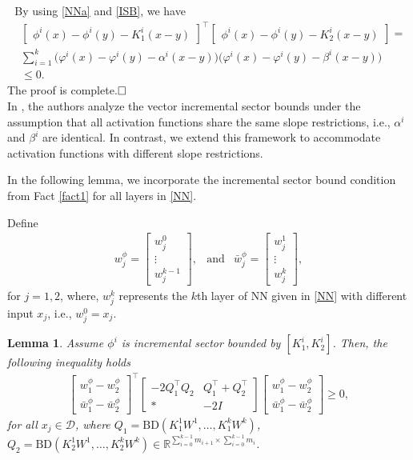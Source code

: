 \documentclass[journal,twoside,web]{ieeecolor}
\renewenvironment{proof}{\vspace{.1cm}\noindent{\sc Proof.}\hspace{0.10cm}\,\,}{$\hfill\Box$\vspace{.1cm}}
\newtheorem{lemma}              [theorem]{Lemma}
\newcommand{\bbm}[1]{\left[\begin{matrix} #1 \end{matrix}\right]}
\begin{document}
\begin{proof}
By using \eqref{NNa} and \eqref{ISB}, we have
\begin{equation}\label{ISBV1}
 \begin{aligned}
&\bbm{\phi^i(x)-\phi^i(y)-K_{1}^i(x-y)}^\top\bbm{\phi^i(x)-\phi^i(y)-K_{2}^i(x-y)}=\\&\sum_{i=1}^{k}\Big(\varphi^i(x)-\varphi^i(y)-\alpha^i(x-y)\Big) \Big(\varphi^i(x)-\varphi^i(y)-\beta^i(x-y)\Big)\\&\leq 0. 
 \end{aligned}
\end{equation}
The proof is complete.\end{proof}\\
In \cite[Lem. 2]{fazlyab2020safety}, the authors analyze the vector incremental sector bounds under the assumption that all activation functions share the same slope restrictions, i.e., $\alpha^i$ and $\beta^i$ are identical. In contrast, we extend this framework to accommodate activation functions with different slope restrictions.

In the following lemma, we incorporate the incremental sector bound condition from Fact \ref{fact1} for all layers in \eqref{NN}. 

Define 
\begin{equation}\label{NNVW}
 \begin{matrix}
 w_j^\phi =\bbm{
w_j^0 \\\vdots \\
w_j^{k-1}
}, & \text{and} & \bar{w}_j^\phi =\bbm{
w_j^1 \\\vdots \\
w_j^k
},
\end{matrix}
\end{equation}
for $j=1,2$, where, $w_j^{k}$ represents the $k$th layer of NN given in \eqref{NN} with different input $x_j$, i.e., $w_j^0=x_j$.   
\begin{lemma}\label{lemma1}
Assume $\phi^i$ is incremental sector bounded by $[K_1^i, K_2^i]$. Then, the following inequality holds 
\begin{equation}\label{LEM1}
 \begin{aligned}
\begin{bmatrix}
w_1^{\phi}-w_2^{\phi}
 \\
\bar{w}_1^{\phi}-\bar{w}_2^{\phi}
\end{bmatrix}^\top \begin{bmatrix}
 -2Q_1^\top Q_2&Q_1^{\top}+Q_2^\top
 \\
\ast&-2I
\end{bmatrix}\begin{bmatrix}
w_1^{\phi}-w_2^{\phi}
 \\
\bar{w}_1^{\phi}-\bar{w}_2^{\phi}
\end{bmatrix}\geq 0, 
\end{aligned}
\end{equation}
for all $x_j\in \mathcal{D}$, where $Q_1=\mathrm{BD}(K_1^1W^1, \dots, K_1^{k}W^{k})$, $Q_2=\mathrm{BD}(K_2^1W^1, \dots, K_2^{k}W^{k})\in \mathbb{R}^{\sum_{i=0}^{k-1} m_{i+1}\times \sum_{i=0}^{k-1} m_{i}}$.
\end{lemma}
\end{document}
